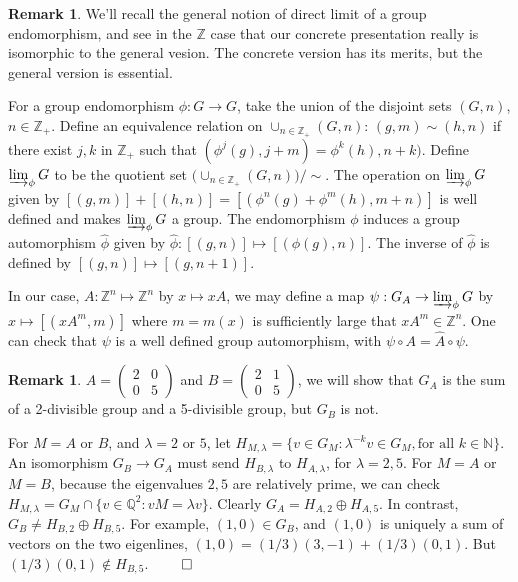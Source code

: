 \documentclass{amsart}
\theoremstyle{definition}
\newtheorem{rem}[equation]{Remark}
\theoremstyle{definition}
\newcommand{\Z}{\mathbb Z}
\newcommand{\Q}{\mathbb Q}
\newcommand{\N}{\mathbb N}
\numberwithin{equation}{subsection}
\begin{document}
\begin{rem} \label{directlimits}
We'll recall the general notion of direct limit of a group
endomorphism, and see in the $\Z$ case that our concrete
presentation really is isomorphic to  the general vesion.
The concrete version has its merits, but the general version
is essential.

For a group endomorphism $\phi : G\to G$, take the union of the
disjoint sets $(G,n)$, $n \in \Z_+$. Define an equivalence relation
on $\cup_{n\in \Z_+}(G,n)$: $(g,m) \sim (h,n)$ if there exist $j,k$ in
$\Z_+$ such that $(\phi^j(g),j+m) = \phi^k(h),n+k)$.
Define
$\varinjlim_{\phi} G$
to be the quotient set
$\big( \cup_{n\in \Z_+}(G,n) \big) /\sim $. The operation on
$\varinjlim_{\phi} G$
given
by $[(g,m)] + [(h,n)] = [(\phi^n(g) + \phi^m (h),m+n)]$ is
well defined and makes
$\varinjlim_{\phi} G$
a group. The endomorphism $\phi$
induces a group  automorphism $\widehat{\phi} $  given by
$\widehat{\phi}: [(g,n)]\mapsto [(\phi(g), n)]$. The inverse of
$\widehat{\phi}$ is defined by
$   [(g,n)]\mapsto [(g, n+1)]$.


In our case,  $A : \Z^n \mapsto \Z^n$ by $x\mapsto xA$,
we may define a map $\psi: G_A \to
\varinjlim_{\phi} G$
by $x\mapsto [(xA^m,m)]$ where $m=m(x)$ is sufficiently large that
$xA^m \in \Z^n$. One can check that
$\psi$ is a well defined group automorphism,
with $\psi \circ A = \widehat A \circ \psi$.
\end{rem}

\begin{rem}   \label{nonisomorphicpair}
$A= \left(\begin{smallmatrix} 2&0 \\ 0&5
\end{smallmatrix}\right)$ and
$B =  \left(\begin{smallmatrix} 2&1 \\ 0&5
\end{smallmatrix}\right)$, we will show that
$G_A$ is the sum of a 2-divisible group and a 5-divisible group,
but $G_B$ is not.

For $M=A \text{ or }B$, and $\lambda =2\text{ or } 5 $,
let $H_{M,\lambda } =
\{v \in G_M: \lambda^{-k}v\in G_M,\text{for all } k\in \N \}$.
An isomorphism $G_B\to G_A$ must send $H_{B,\lambda }$ to $H_{A,\lambda }$,
for $\lambda =2,5$.
For $M=A $ or $M=B$,
because the eigenvalues $2,5$  are relatively prime,
we can check
$H_{M,\lambda } = G_M \cap \{ v\in \Q^2: vM= \lambda v  \}  $.
Clearly $G_A = H_{A,2 }\oplus H_{A, 5 }$.
In contrast,
$G_B \neq H_{B,2 }\oplus H_{B, 5 }$. For example, $(1,0)\in G_B$, and
$(1,0)$ is uniquely a sum of vectors on the two eigenlines,
$(1,0) = (1/3) (3,-1)   +(1/3)(0,1)  $. But $(1/3)(0,1) \notin H_{B,5}$. $\qed$
\end{rem}
\end{document}
